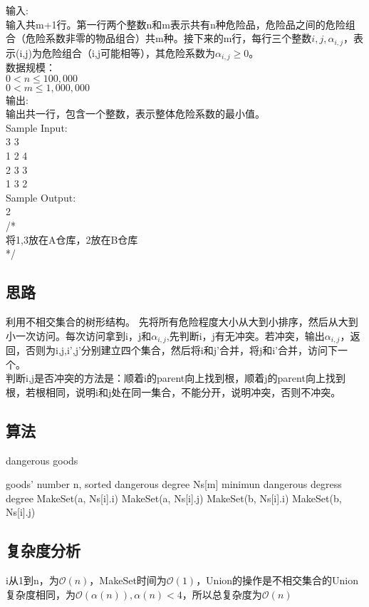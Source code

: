 \documentclass[UTF8]{ctexart}
\begin{document}
输入:\\
输入共m+1行。第一行两个整数n和m表示共有n种危险品，危险品之间的危险组合（危险系数非零的物品组合）共m种。接下来的m行，每行三个整数$i,j,\alpha_{i,j}$，表示(i,j)为危险组合（i,j可能相等），其危险系数为$\alpha_{i,j}\geq 0$。
\\
数据规模：\\

$0<n\leq 100,000$\\
$0<m\leq1,000,000$\\

输出:\\
输出共一行，包含一个整数，表示整体危险系数的最小值。\\

Sample Input:\\
3 3\\
1 2 4\\
2 3 3\\
1 3 2\\

Sample Output:\\
2\\
/*\\
将1,3放在A仓库，2放在B仓库\\
*/\\

\subsection{思路}
利用不相交集合的树形结构。
先将所有危险程度大小从大到小排序，然后从大到小一次访问。每次访问拿到i，j和$\alpha_{i,j}$,先判断i，j有无冲突。若冲突，输出$\alpha_{i,j}$，返回，否则为i,j,i',j'分别建立四个集合，然后将i和j'合并，将j和i'合并，访问下一个。\\
判断i,j是否冲突的方法是：顺着i的parent向上找到根，顺着j的parent向上找到根，若根相同，说明i和j处在同一集合，不能分开，说明冲突，否则不冲突。

\subsection{算法}

\renewcommand{\algorithmicrequire}{\textbf{输入:}}
\renewcommand{\algorithmicensure}{\textbf{输出:}}
\begin{algorithm}
	\caption{dangerous goods}
	\begin{algorithmic}[1]
	\Require goods' number n, sorted dangerous degree Ns[m]
	\Ensure minimun dangerous degress degree
			MakeSet(a, Ns[i].i)
		\EndIf
			MakeSet(a, Ns[i].j)
		\EndIf
			MakeSet(b, Ns[i].i)
		\EndIf
			MakeSet(b, Ns[i].j)
		\EndIf
		\EndIf
	\EndFor
	\end{algorithmic}
\end{algorithm}

\subsection{复杂度分析}
i从1到n，为$\mathcal{O}(n)$，MakeSet时间为$\mathcal{O}(1)$，Union的操作是不相交集合的Union复杂度相同，为$\mathcal{O}(\alpha(n)), \alpha(n) < 4$，所以总复杂度为$\mathcal{O}(n)$
\end{document}
